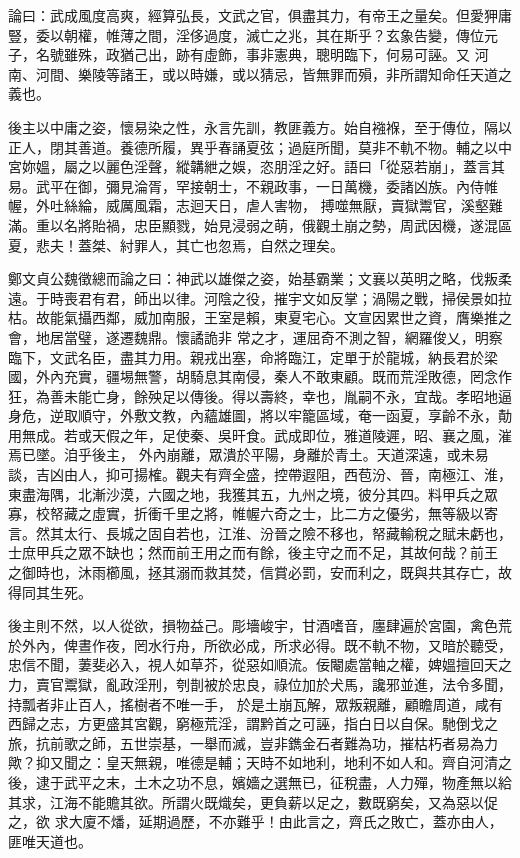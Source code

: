 \begin{pinyinscope}
 論曰：武成風度高爽，經算弘長，文武之官，俱盡其力，有帝王之量矣。但愛狎庸豎，委以朝權，帷薄之間，淫侈過度，滅亡之兆，其在斯乎？玄象告變，傳位元子，名號雖殊，政猶己出，跡有虛飾，事非憲典，聰明臨下，何易可誣。又
 河南、河間、樂陵等諸王，或以時嫌，或以猜忌，皆無罪而殞，非所謂知命任天道之義也。



 後主以中庸之姿，懷易染之性，永言先訓，教匪義方。始自襁褓，至于傳位，隔以正人，閉其善道。養德所履，異乎春誦夏弦；過庭所聞，莫非不軌不物。輔之以中宮妳媼，屬之以麗色淫聲，縱韝紲之娛，恣朋淫之好。語曰「從惡若崩」，蓋言其易。武平在御，彌見淪胥，罕接朝士，不親政事，一日萬機，委諸凶族。內侍帷幄，外吐絲綸，威厲風霜，志迴天日，虐人害物，
 搏噬無厭，賣獄鬻官，溪壑難滿。重以名將貽禍，忠臣顯戮，始見浸弱之萌，俄觀土崩之勢，周武因機，遂混區夏，悲夫！蓋桀、紂罪人，其亡也忽焉，自然之理矣。



 鄭文貞公魏徵總而論之曰：神武以雄傑之姿，始基霸業；文襄以英明之略，伐叛柔遠。于時喪君有君，師出以律。河陰之役，摧宇文如反掌；渦陽之戰，掃侯景如拉枯。故能氣攝西鄰，威加南服，王室是賴，東夏宅心。文宣因累世之資，膺樂推之會，地居當璧，遂遷魏鼎。懷譎詭非
 常之才，運屈奇不測之智，網羅俊乂，明察臨下，文武名臣，盡其力用。親戎出塞，命將臨江，定單于於龍城，納長君於梁國，外內充實，疆埸無警，胡騎息其南侵，秦人不敢東顧。既而荒淫敗德，罔念作狂，為善未能亡身，餘殃足以傳後。得以壽終，幸也，胤嗣不永，宜哉。孝昭地逼身危，逆取順守，外敷文教，內蘊雄圖，將以牢籠區域，奄一函夏，享齡不永，勣用無成。若或天假之年，足使秦、吳旰食。武成即位，雅道陵遲，昭、襄之風，漼焉已墜。洎乎後主，
 外內崩離，眾潰於平陽，身離於青土。天道深遠，或未易談，吉凶由人，抑可揚榷。觀夫有齊全盛，控帶遐阻，西苞汾、晉，南極江、淮，東盡海隅，北漸沙漠，六國之地，我獲其五，九州之境，彼分其四。料甲兵之眾寡，校帑藏之虛實，折衝千里之將，帷幄六奇之士，比二方之優劣，無等級以寄言。然其太行、長城之固自若也，江淮、汾晉之險不移也，帑藏輸稅之賦未虧也，士庶甲兵之眾不缺也；然而前王用之而有餘，後主守之而不足，其故何哉？前王
 之御時也，沐雨櫛風，拯其溺而救其焚，信賞必罰，安而利之，既與共其存亡，故得同其生死。



 後主則不然，以人從欲，損物益己。彫墻峻宇，甘酒嗜音，廛肆遍於宮園，禽色荒於外內，俾晝作夜，罔水行舟，所欲必成，所求必得。既不軌不物，又暗於聽受，忠信不聞，萋斐必入，視人如草芥，從惡如順流。佞閹處當軸之權，婢媼擅回天之力，賣官鬻獄，亂政淫刑，刳剒被於忠良，祿位加於犬馬，讒邪並進，法令多聞，持瓢者非止百人，搖樹者不唯一手，
 於是土崩瓦解，眾叛親離，顧瞻周道，咸有西歸之志，方更盛其宮觀，窮極荒淫，謂黔首之可誣，指白日以自保。馳倒戈之旅，抗前歌之師，五世崇基，一舉而滅，豈非鐫金石者難為功，摧枯朽者易為力歟？抑又聞之：皇天無親，唯德是輔；天時不如地利，地利不如人和。齊自河清之後，逮于武平之末，土木之功不息，嬪嬙之選無已，征稅盡，人力殫，物產無以給其求，江海不能贍其欲。所謂火既熾矣，更負薪以足之，數既窮矣，又為惡以促之，欲
 求大廈不燔，延期過歷，不亦難乎！由此言之，齊氏之敗亡，蓋亦由人，匪唯天道也。



\end{pinyinscope}